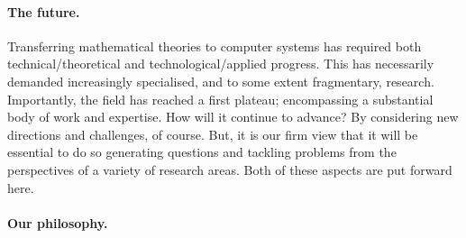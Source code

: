 \documentclass[11pt,twocolumn]{article}
\begin{document}
\paragraph*{The future.}

Transferring mathematical theories to computer systems has required both
technical/theoretical and technological/applied progress.  This has
necessarily demanded increasingly specialised, and to some extent fragmentary,
research.  Importantly, the field has reached a first plateau; encompassing a
substantial body of work and expertise.  How will it continue to advance?  By
considering new directions and challenges, of course.  But, it is our firm
view that it will be essential to do so generating questions and tackling
problems from the perspectives of a variety of research areas.  Both of these
aspects are put forward here.

\paragraph*{Our philosophy.}
\end{document}
